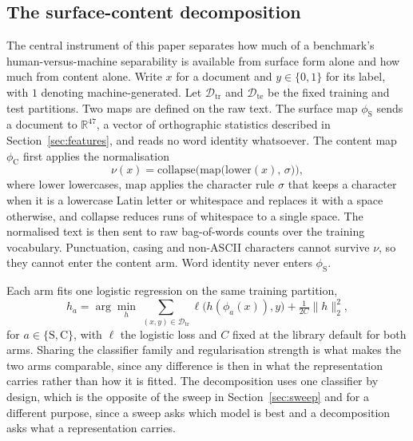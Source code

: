 \documentclass[conference,a4paper]{IEEEtran}
\begin{document}
\subsection{The surface-content decomposition}
\label{sec:decomp-def}

The central instrument of this paper separates how much of a benchmark's human-versus-machine separability is available from surface form alone and how much from content alone. Write $x$ for a document and $y \in \{0, 1\}$ for its label, with $1$ denoting machine-generated. Let $\mathcal{D}_{\text{tr}}$ and $\mathcal{D}_{\text{te}}$ be the fixed training and test partitions. Two maps are defined on the raw text. The surface map $\phi_{\mathrm{S}}$ sends a document to $\mathbb{R}^{47}$, a vector of orthographic statistics described in Section~\ref{sec:features}, and reads no word identity whatsoever. The content map $\phi_{\mathrm{C}}$ first applies the normalisation
\begin{equation}
\label{eq:norm}
\nu(x) = \mathrm{collapse}\Big(\mathrm{map}\big(\mathrm{lower}(x),\, \sigma\big)\Big),
\end{equation}
where $\mathrm{lower}$ lowercases, $\mathrm{map}$ applies the character rule $\sigma$ that keeps a character when it is a lowercase Latin letter or whitespace and replaces it with a space otherwise, and $\mathrm{collapse}$ reduces runs of whitespace to a single space. The normalised text is then sent to raw bag-of-words counts over the training vocabulary. Punctuation, casing and non-ASCII characters cannot survive $\nu$, so they cannot enter the content arm. Word identity never enters $\phi_{\mathrm{S}}$.

Each arm fits one logistic regression on the same training partition,
\begin{equation}
\label{eq:arm}
h_{a}  =  \arg\min_{h} \, \sum_{(x,y) \in \mathcal{D}_{\text{tr}}} \ell\big(h(\phi_{a}(x)), y\big)  +  \tfrac{1}{2C}\lVert h \rVert_2^2 ,
\end{equation}
for $a \in \{\mathrm{S}, \mathrm{C}\}$, with $\ell$ the logistic loss and $C$ fixed at the library default for both arms. Sharing the classifier family and regularisation strength is what makes the two arms comparable, since any difference is then in what the representation carries rather than how it is fitted. The decomposition uses one classifier by design, which is the opposite of the sweep in Section~\ref{sec:sweep} and for a different purpose, since a sweep asks which model is best and a decomposition asks what a representation carries.
\end{document}
